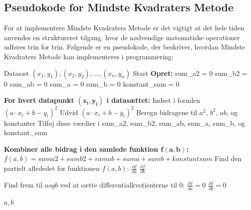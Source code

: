 \subsection{Pseudokode for Mindste Kvadraters Metode}
For at implementere Mindste Kvadraters Metode er det vigtigt at det hele tiden anvendes en struktureret tilgang, hvor de nødvendige matematiske operationer udføres trin for trin. Følgende er en pseudokode, der beskriver, hvordan Mindste Kvadraters Metode kan implementeres i programmering:
\begin{algorithmic}[1] 
        \REQUIRE Datasæt \((x_1, y_1), (x_2, y_2), \dots, (x_n, y_n)\)
        \STATE Start
        \STATE \textbf{Opret:}
        \STATE \hspace{0.5cm} sum\_a2 = 0 
        \STATE \hspace{0.5cm} sum\_b2 = 0  
        \STATE \hspace{0.5cm} sum\_ab = 0  
        \STATE \hspace{0.5cm} sum\_a = 0   
        \STATE \hspace{0.5cm} sum\_b = 0  
        \STATE \hspace{0.5cm} konstant\_sum = 0
        
        \STATE \textbf{For hvert datapunkt $\mathbf{(x_i, y_i)}$ i datasættet:}
        \STATE Indset i formlen $(a \cdot x_i + b - y_i)^2$
        \STATE \hspace{0.5cm} Udvid \((a \cdot x_i + b - y_i)^2\)
        \STATE \hspace{0.5cm} Beregn bidragene til \(a^2\), \(b^2\), \(ab\), og konstanter
        \STATE \hspace{0.5cm} Tilføj disse værdier i sum\_a2, sum\_b2, sum\_ab, sum\_a, sum\_b, og konstant\_sum
        
        \STATE \textbf{Kombiner alle bidrag i den samlede funktion $\mathbf{f(a,b) }$:}
        \STATE \hspace{0.5cm} $f(a, b) = sum a2 + sum b2 + sum ab + sum a + sum b + konstant sum$        
        \STATE Find den partielt aflededet for funktionen $f(a, b)$:
        \STATE \hspace{0.5cm} $\frac{\partial f}{\partial a}$
        \STATE \hspace{0.5cm} $\frac{\partial f}{\partial b}$
        
        \STATE Find frem til $a og b$ ved at sætte differentialkvotienterne til 0:
        \STATE \hspace{0.5cm} \(\frac{\partial f}{\partial a} = 0\)
        \STATE \hspace{0.5cm} \(\frac{\partial f}{\partial b} = 0\)
        
        \RETURN \(a, b\)
\end{algorithmic}
